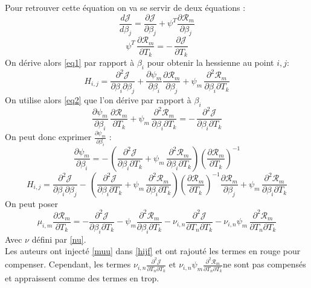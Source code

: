 \documentclass[a4paper,12pt]{article}
\newcommand{\bepar}[1]{
	\left( #1 \right)  
}
\newcommand{\parfracD}[3]{
	\frac{\partial^2 #1}{\partial #2 \partial #3}
}
\newcommand{\parfrac}[2]{
	\frac{\partial #1}{\partial #2}
}
\newcommand{\Jj}{\mathcal{J}}
\newcommand{\Rr}{\mathcal{R}}
\numberwithin{equation}{section} %
\begin{document}
\noindent Pour retrouver cette équation on va se servir de deux équations :
\begin{equation}
\frac{d\mathcal{J}}{d\beta_j} = \parfrac{\mathcal{J}}{\beta_j} + \psi^T \parfrac{\mathcal{R}_m}{\beta_j} \label{eq1}
\end{equation}
\begin{equation}
\psi^T\, \parfrac{\mathcal{R}_m}{T_k} = -\, \parfrac{\mathcal{J}}{T_k} \label{eq2}
\end{equation}
On dérive alors \eqref{eq1} par rapport à $\beta_i$ pour obtenir la hessienne au point $i,j$:
\begin{equation}
H_{i,j} = \parfracD{\Jj}{\beta_i}{\beta_j} + 
\parfrac{\psi_m}{\beta_i} \parfrac{\Rr_m}{\beta_j} + \psi_m\, \parfracD{\Rr_m}{\beta_i}{T_k} \label{hess}
\end{equation}
On utilise alors \eqref{eq2} que l'on dérive par rapport à $\beta_i$
\begin{equation}
\parfrac{\psi_m}{\beta_i}\, \parfrac{\Rr_m}{T_k} + \psi_m\, \parfracD{\Rr_m}{\beta_i}{T_k} = -\, \parfracD{\Jj}{\beta_i}{T_k}
\end{equation}
On peut donc exprimer $\displaystyle \parfrac{\psi_m}{\beta_i}$ :
\begin{equation}
\parfrac{\psi_m}{\beta_i} = -\, \bepar{\parfracD{\Jj}{\beta_i}{T_k} + \psi_m\, \parfracD{\Rr_m}{\beta_i}{T_k}}\bepar{\parfrac{\Rr_m}{T_k}}^{-1}
\end{equation}
\begin{equation}
H_{i,j} = \parfracD{\Jj}{\beta_i}{\beta_j} -\, \bepar{\parfracD{\Jj}{\beta_i}{T_k} + \psi_m\, \parfracD{\Rr_m}{\beta_i}{T_k}}\bepar{\parfrac{\Rr_m}{T_k}}^{-1} \parfrac{\Rr_m}{\beta_j} + \psi_m\, \parfracD{\Rr_m}{\beta_i}{T_k}
\end{equation}
On peut poser 
\begin{equation}
\mu_{i,m} \parfrac{\Rr_m}{T_k} = - \parfracD{\Jj}{\beta_i}{T_k} - \psi_m \parfracD{\Rr_m}{\beta_i}{T_k} -\nu_{i,n} \parfracD{\Jj}{T_n}{T_k} - \nu_{i,n}\psi_m \,\parfracD{\Rr_m}{T_n}{T_k} \label{muu}
\end{equation}
Avec $\nu$ défini par \eqref{nu}.\\
Les auteurs ont injecté \eqref{muu} dans \eqref{hijf} et ont rajouté les termes en rouge pour compenser. Cependant, les termes $ \displaystyle \nu_{i,n} \parfracD{\Jj}{T_n}{T_k} \text{ et } \nu_{i,n}\psi_m \parfracD{\Rr_m}{T_n}{T_k}$ne sont pas compensés et appraissent comme des termes en trop.

\pagebreak
\end{document}

